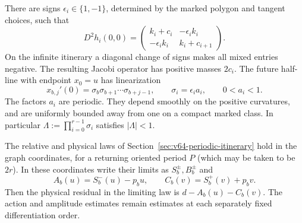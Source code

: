 \begin{lemma}\label{lem:v65-signed-jacobi}
There are signs $\epsilon_i\in\{1,-1\}$, determined by the marked
polygon and tangent choices, such that
\begin{equation}\label{eq:v65-graph-hessian}
 D^2h_i(0,0)=
 \begin{pmatrix}k_i+c_i&-\epsilon_i k_i\\
                 -\epsilon_i k_i&k_i+c_{i+1}\end{pmatrix}.
\end{equation}
On the infinite itinerary a diagonal change of signs makes all mixed
entries negative.  The resulting Jacobi operator has positive masses
$2c_i$.  The future half-line with endpoint $x_0=u$ has linearization
\begin{equation}\label{eq:v65-linear-visits}
 x_{b,j}'(0)=\sigma_b\sigma_{b+1}\cdots\sigma_{b+j-1},\qquad
 \sigma_i=\epsilon_i a_i,\qquad 0<a_i<1.
\end{equation}
The factors $a_i$ are periodic.  They depend smoothly on the positive
curvatures, and are uniformly bounded away from one on a compact marked
class.  In particular $\Lambda:=\prod_{i=0}^{r-1}\sigma_i$ satisfies
$|\Lambda|<1$.

The relative and physical laws of Section~\ref{sec:v64-periodic-itinerary}
hold in the graph coordinates, for a returning oriented period $P$
(which may be taken to be $2r$).  In these coordinates write their limits
as $S_b^\pm,B_b^\pm$ and
\begin{equation}\label{eq:v65-physical-actions}
 A_b(u)=S_b^-(u)-p_bu,\qquad C_b(v)=S_b^+(v)+p_bv.
\end{equation}
Then the physical residual in the limiting law is
$d-A_b(u)-C_b(v)$.  The action and amplitude estimates remain estimates
at each separately fixed differentiation order.
\end{lemma}
